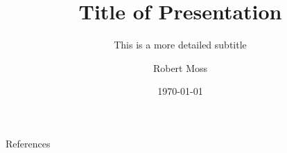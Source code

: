 \documentclass[aspectratio=169]{beamer}
\title{Title of Presentation}
\subtitle{This is a more detailed subtitle}
\author{Robert Moss}
\institute{Stanford University}
\date{\today}
\begin{document}
\begin{frame}
    \maketitle
\end{frame}

% 
% 
% 
% 
% 
% 


\begin{frame}{References}
    \printbibliography
\end{frame}
\end{document}

